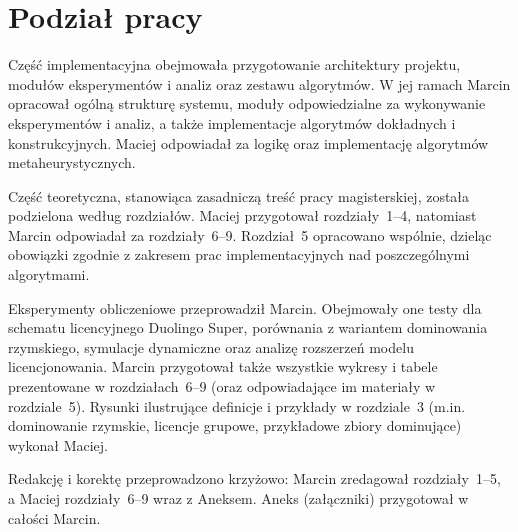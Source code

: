 \chapter*{Podział pracy}

Część implementacyjna obejmowała przygotowanie architektury projektu, modułów eksperymentów i analiz oraz zestawu algorytmów. W jej ramach Marcin opracował ogólną strukturę systemu, moduły odpowiedzialne za wykonywanie eksperymentów i analiz, a także implementacje algorytmów dokładnych i konstrukcyjnych. Maciej odpowiadał za logikę oraz implementację algorytmów metaheurystycznych.

Część teoretyczna, stanowiąca zasadniczą treść pracy magisterskiej, została podzielona według rozdziałów. Maciej przygotował rozdziały~1--4, natomiast Marcin odpowiadał za rozdziały~6--9. Rozdział~5 opracowano wspólnie, dzieląc obowiązki zgodnie z zakresem prac implementacyjnych nad poszczególnymi algorytmami.

Eksperymenty obliczeniowe przeprowadził Marcin. Obejmowały one testy dla schematu licencyjnego Duolingo Super, porównania z wariantem dominowania rzymskiego, symulacje dynamiczne oraz analizę rozszerzeń modelu licencjonowania. Marcin przygotował także wszystkie wykresy i tabele prezentowane w rozdziałach~6--9 (oraz odpowiadające im materiały w rozdziale~5). Rysunki ilustrujące definicje i przykłady w rozdziale~3 (m.in. dominowanie rzymskie, licencje grupowe, przykładowe zbiory dominujące) wykonał Maciej.

Redakcję i korektę przeprowadzono krzyżowo: Marcin zredagował rozdziały~1--5, a Maciej rozdziały~6--9 wraz z Aneksem. Aneks (załączniki) przygotował w całości Marcin.
